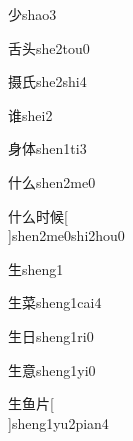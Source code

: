 \begin{verbete}[4]{少}{shao3}
\end{verbete}

\begin{verbete}[6;5]{舌头}{she2tou0}
\end{verbete}

\begin{verbete}[13;4]{摄氏}{she2shi4}
\end{verbete}

\begin{verbete}[10]{谁}{shei2}
\end{verbete}

\begin{verbete}[7;7]{身体}{shen1ti3}
\end{verbete}

\begin{verbete}[4;3]{什么}{shen2me0}
\end{verbete}

\begin{verbete}[4;3;7;10]{什么时候}[\\]{shen2me0shi2hou0}
\end{verbete}

\begin{verbete}[5]{生}{sheng1}
\end{verbete}

\begin{verbete}[5;12]{生菜}{sheng1cai4}
\end{verbete}

\begin{verbete}[5;4]{生日}{sheng1ri0}
\end{verbete}

\begin{verbete}[5;13]{生意}{sheng1yi0}
\end{verbete}

\begin{verbete}[5;8;4]{生鱼片}[\\]{sheng1yu2pian4}
\end{verbete}

